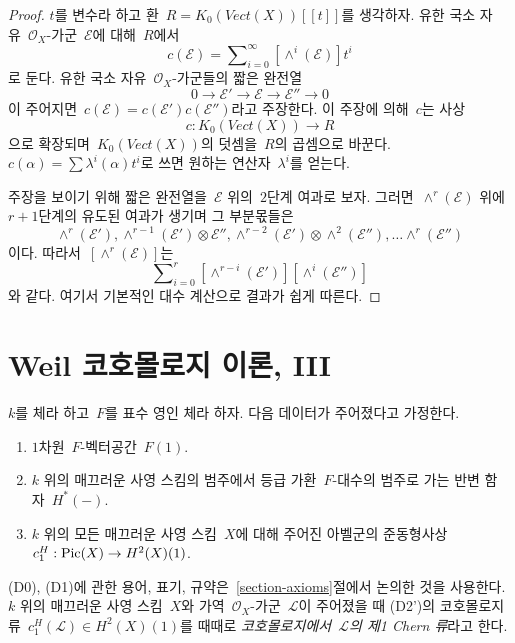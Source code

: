 \begin{proof}
$t$를 변수라 하고 환\  $R = K_0(\textit{Vect}(X))[[t]]$를 생각하자.
유한 국소 자유\  $\mathcal{O}_X$-가군\  $\mathcal{E}$에 대해\  $R$에서
$$
c(\mathcal{E}) = \sum\nolimits_{i = 0}^\infty [\wedge^i(\mathcal{E})] t^i
$$
로 둔다. 유한 국소 자유\  $\mathcal{O}_X$-가군들의 짧은 완전열
$$
0 \to \mathcal{E}' \to \mathcal{E} \to \mathcal{E}'' \to 0
$$
이 주어지면\ 
$c(\mathcal{E}) = c(\mathcal{E}') c(\mathcal{E}'')$라고 주장한다.
이 주장에 의해\  $c$는 사상
$$
c :  K_0(\textit{Vect}(X)) \longrightarrow R
$$
으로 확장되며\  $K_0(\textit{Vect}(X))$의 덧셈을\  $R$의 곱셈으로
바꾼다. $c(\alpha) = \sum \lambda^i(\alpha) t^i$로 쓰면 원하는
연산자\  $\lambda^i$를 얻는다.

\medskip\noindent
주장을 보이기 위해 짧은 완전열을\  $\mathcal{E}$ 위의\  $2$단계
여과로 보자. 그러면\  $\wedge^r(\mathcal{E})$ 위에\  $r + 1$단계의
유도된 여과가 생기며 그 부분몫들은
$$
\wedge^r(\mathcal{E}'),
\wedge^{r - 1}(\mathcal{E}') \otimes \mathcal{E}'',
\wedge^{r - 2}(\mathcal{E}') \otimes \wedge^2(\mathcal{E}''), \ldots
\wedge^r(\mathcal{E}'')
$$
이다. 따라서\  $[\wedge^r(\mathcal{E})]$는
$$
\sum\nolimits_{i = 0}^r
[\wedge^{r - i}(\mathcal{E}')] [\wedge^i(\mathcal{E}'')]
$$
와 같다. 여기서 기본적인 대수 계산으로 결과가 쉽게 따른다.
\end{proof}










\section{Weil 코호몰로지 이론, III}
\label{section-c1}

\noindent
$k$를 체라 하고\  $F$를 표수 영인 체라 하자. 다음 데이터가
주어졌다고 가정한다.
\begin{enumerate}
\item[(D0)] $1$차원\  $F$-벡터공간\  $F(1)$.
\item[(D1)] $k$ 위의 매끄러운 사영 스킴의 범주에서 등급 가환\ 
$F$-대수의 범주로 가는 반변 함자\  $H^*(-)$.
\item[(D2')] $k$ 위의 모든 매끄러운 사영 스킴\  $X$에 대해 주어진
아벨군의 준동형사상\  $c_1^H : \mathop{\mathrm{Pic}}\nolimits(X) \to H^2(X)(1)$.
\end{enumerate}
(D0), (D1)에 관한 용어, 표기, 규약은\  \ref{section-axioms}절에서
논의한 것을 사용한다. $k$ 위의 매끄러운 사영 스킴\  $X$와 가역\ 
$\mathcal{O}_X$-가군\  $\mathcal{L}$이 주어졌을 때 (D2')의 코호몰로지류\ 
$c_1^H(\mathcal{L}) \in H^2(X)(1)$를 때때로
{\it 코호몰로지에서\  $\mathcal{L}$의 제1 Chern 류}라고 한다.

